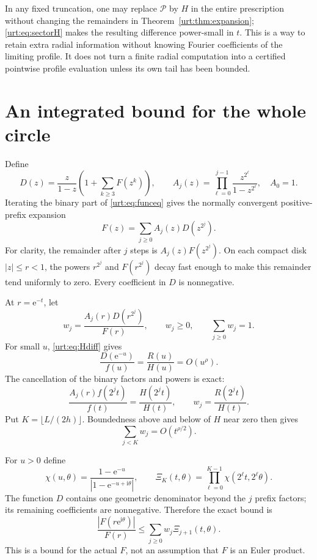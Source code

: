 \documentclass[11pt,letterpaper]{article}
\theoremstyle{remark}\newtheorem{remark}[theorem]{Remark}
\newcommand{\Pc}{\mathcal P}\newcommand{\Bc}{\mathcal B}\newcommand{\dd}{\mathrm d}
\newcommand{\ii}{\mathrm i}\newcommand{\ee}{\mathrm e}\newcommand{\ZZ}{\mathbb Z}\newcommand{\NN}{\mathbb N}
\begin{document}
In any fixed truncation, one may replace $\Pc$ by $H$ in the entire prescription without changing the remainders in Theorem~\ref{urt:thm:expansion}; \eqref{urt:eq:sectorH} makes the resulting difference power-small in $t$. This is a way to retain extra radial information without knowing Fourier coefficients of the limiting profile. It does not turn a finite radial computation into a certified pointwise profile evaluation unless its own tail has been bounded.

\section{An integrated bound for the whole circle}\label{urt:sec:circle}
Define
\begin{equation}\label{urt:eq:prefixdefs}
 D(z)=\frac{z}{1-z}\left(1+\sum_{k\ge3}F(z^k)\right),\qquad
 A_j(z)=\prod_{\ell=0}^{j-1}\frac{z^{2^\ell}}{1-z^{2^\ell}},\quad A_0=1.
\end{equation}
Iterating the binary part of \eqref{urt:eq:funceq} gives the normally convergent positive-prefix expansion
\begin{equation}\label{urt:eq:prefixsum}
 F(z)=\sum_{j\ge0}A_j(z)D(z^{2^j}).
\end{equation}
For clarity, the remainder after $j$ steps is $A_j(z)F(z^{2^j})$. On each compact disk $|z|\le r<1$, the powers $r^{2^j}$ and $F(r^{2^j})$ decay fast enough to make this remainder tend uniformly to zero. Every coefficient in $D$ is nonnegative.

At $r=\ee^{-t}$, let
\[
 w_j=\frac{A_j(r)D(r^{2^j})}{F(r)},\qquad w_j\ge0,\qquad\sum_{j\ge0}w_j=1.
\]
For small $u$, \eqref{urt:eq:Hdiff} gives
\[
 \frac{D(\ee^{-u})}{f(u)}=\frac{R(u)}{H(u)}=O(u^\rho).
\]
The cancellation of the binary factors and powers is exact:
\begin{equation}\label{urt:eq:prefixcancel}
 \frac{A_j(r)f(2^jt)}{f(t)}=\frac{H(2^jt)}{H(t)},\qquad
 w_j=\frac{R(2^jt)}{H(t)}.
\end{equation}
Put $K=\lfloor L/(2h)\rfloor$. Boundedness above and below of $H$ near zero then gives
\begin{equation}\label{urt:eq:shortweights}
 \sum_{j<K}w_j=O(t^{\rho/2}).
\end{equation}

For $u>0$ define
\[
 \chi(u,\theta)=\frac{1-\ee^{-u}}{|1-\ee^{-u+\ii\theta}|},\qquad
 \Xi_K(t,\theta)=\prod_{\ell=0}^{K-1}\chi(2^\ell t,2^\ell\theta).
\]
The function $D$ contains one geometric denominator beyond the $j$ prefix factors; its remaining coefficients are nonnegative. Therefore the exact bound is
\begin{equation}\label{urt:eq:circlebound}
 \frac{|F(r\ee^{\ii\theta})|}{F(r)}
 \le\sum_{j\ge0}w_j\Xi_{j+1}(t,\theta).
\end{equation}
This is a bound for the actual $F$, not an assumption that $F$ is an Euler product.
\end{document}

